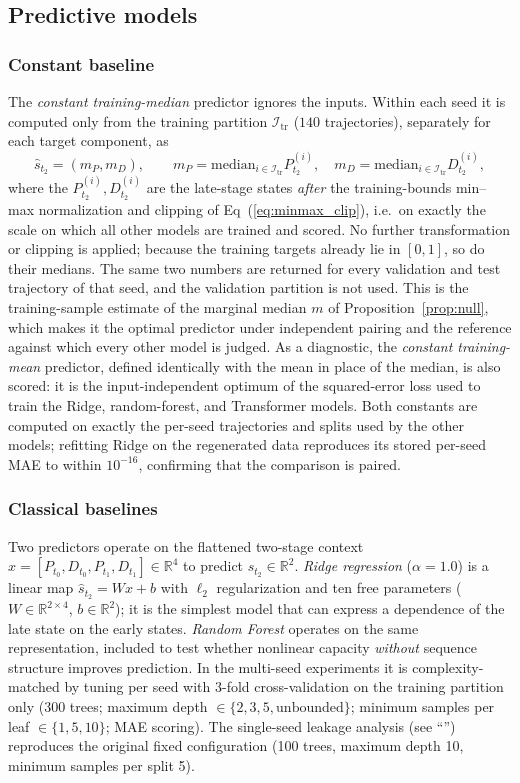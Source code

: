 \documentclass[10pt,letterpaper]{article}
\begin{document}
\subsection*{Predictive models}
\label{subsec:models}

\subsubsection*{Constant baseline}
The \emph{constant training-median} predictor ignores the inputs. Within each seed it is computed only from the training partition $\mathcal{I}_{\mathrm{tr}}$ ($140$ trajectories), separately for each target component, as
\[
\hat{s}_{t_2}=(m_P,m_D),\qquad m_P=\mathrm{median}_{i\in\mathcal{I}_{\mathrm{tr}}}P^{(i)}_{t_2},\quad m_D=\mathrm{median}_{i\in\mathcal{I}_{\mathrm{tr}}}D^{(i)}_{t_2},
\]
where the $P^{(i)}_{t_2},D^{(i)}_{t_2}$ are the late-stage states \emph{after} the training-bounds min--max normalization and clipping of Eq~(\ref{eq:minmax_clip}), i.e.\ on exactly the scale on which all other models are trained and scored. No further transformation or clipping is applied; because the training targets already lie in $[0,1]$, so do their medians. The same two numbers are returned for every validation and test trajectory of that seed, and the validation partition is not used. This is the training-sample estimate of the marginal median $m$ of Proposition~\ref{prop:null}, which makes it the optimal predictor under independent pairing and the reference against which every other model is judged. As a diagnostic, the \emph{constant training-mean} predictor, defined identically with the mean in place of the median, is also scored: it is the input-independent optimum of the squared-error loss used to train the Ridge, random-forest, and Transformer models. Both constants are computed on exactly the per-seed trajectories and splits used by the other models; refitting Ridge on the regenerated data reproduces its stored per-seed MAE to within $10^{-16}$, confirming that the comparison is paired.

\subsubsection*{Classical baselines}
Two predictors operate on the flattened two-stage context $x=[P_{t_0},D_{t_0},P_{t_1},D_{t_1}]\in\mathbb{R}^4$ to predict $\hat{s}_{t_2}\in\mathbb{R}^2$. \emph{Ridge regression} ($\alpha=1.0$) is a linear map $\hat{s}_{t_2}=Wx+b$ with $\ell_2$ regularization and ten free parameters ($W\in\mathbb{R}^{2\times4}$, $b\in\mathbb{R}^2$); it is the simplest model that can express a dependence of the late state on the early states. \emph{Random Forest} operates on the same representation, included to test whether nonlinear capacity \emph{without} sequence structure improves prediction. In the multi-seed experiments it is complexity-matched by tuning per seed with 3-fold cross-validation on the training partition only (300 trees; maximum depth $\in\{2,3,5,\text{unbounded}\}$; minimum samples per leaf $\in\{1,5,10\}$; MAE scoring). The single-seed leakage analysis (see ``'') reproduces the original fixed configuration (100 trees, maximum depth 10, minimum samples per split 5).
\end{document}
